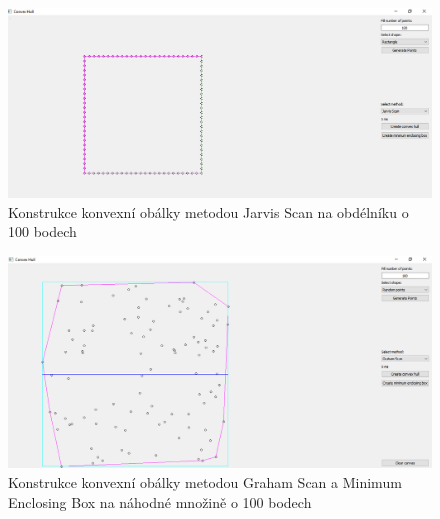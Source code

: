 \documentclass[a4paper,11pt,twoside]{article}
\begin{document}
\vspace{0.2cm}
\begin{figure}[hbt!] 
\begin{center}
\includegraphics[width=15cm]{pictures/jarvis_rectangle.png} 
\caption[Konstrukce konvexní obálky metodou Jarvis Scan na obdélníku o 100 bodech]{Konstrukce konvexní obálky metodou Jarvis Scan na obdélníku o 100 bodech}
\label{fig:jarre}
\end{center}
\end{figure}
\vspace{-0.4cm}

\vspace{0.2cm}
\begin{figure}[hbt!] 
\begin{center}
\includegraphics[width=15cm]{pictures/graham_random_enclosing_box.png} 
\caption[Konstrukce konvexní obálky metodou Graham Scan a Minimum Enclosing Box na náhodné množiny o 100 bodech]{Konstrukce konvexní obálky metodou Graham Scan a Minimum Enclosing Box na náhodné množině o 100 bodech}
\label{fig:enc}
\end{center}
\end{figure}
\vspace{-0.4cm}
\end{document}
